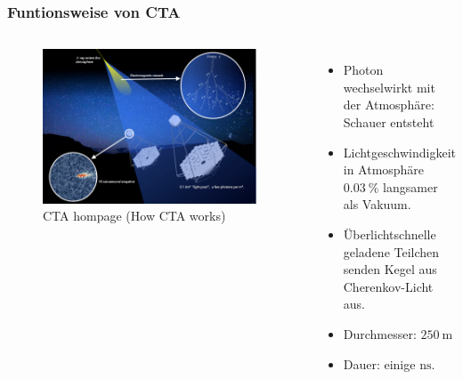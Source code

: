 \documentclass[aspectratio=1610, professionalfonts, 9pt]{beamer}
\begin{document}
  \begin{frame}
    \frametitle{Funtionsweise von CTA}
    \begin{columns}
        \begin{figure}
          \includegraphics[width=0.95\textwidth]{pictures/CTA.png}
          \caption{CTA hompage (How CTA works)}
          \label{abb:CTA}
        \end{figure}
        \begin{itemize}
          \item Photon wechselwirkt mit der Atmosphäre: Schauer entsteht
          \item Lichtgeschwindigkeit in Atmosphäre $\SI{0.03}{\percent}$ langsamer als Vakuum.
          \item Überlichtschnelle geladene Teilchen senden Kegel aus Cherenkov-Licht aus.
          \item Durchmesser: $\SI{250}{\m}$
          \item Dauer: einige $\si{\nano\s}$.
        \end{itemize}
    \end{columns}
  \end{frame}
\end{document}
